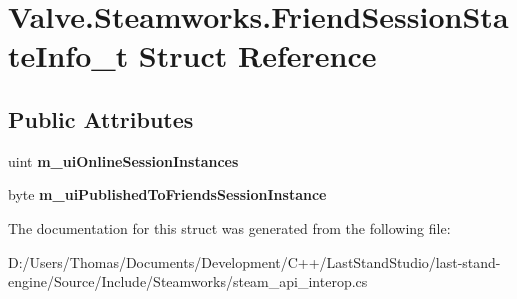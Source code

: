 \hypertarget{structValve_1_1Steamworks_1_1FriendSessionStateInfo__t}{}\section{Valve.\+Steamworks.\+Friend\+Session\+State\+Info\+\_\+t Struct Reference}
\label{structValve_1_1Steamworks_1_1FriendSessionStateInfo__t}
\subsection*{Public Attributes}
\begin{DoxyCompactItemize}
\item 
\hypertarget{structValve_1_1Steamworks_1_1FriendSessionStateInfo__t_a553ea9dabd98cb59e02837e0fda3c3c8}{}uint {\bfseries m\+\_\+ui\+Online\+Session\+Instances}\label{structValve_1_1Steamworks_1_1FriendSessionStateInfo__t_a553ea9dabd98cb59e02837e0fda3c3c8}

\item 
\hypertarget{structValve_1_1Steamworks_1_1FriendSessionStateInfo__t_ad781438dfe6156adac189dd569e88226}{}byte {\bfseries m\+\_\+ui\+Published\+To\+Friends\+Session\+Instance}\label{structValve_1_1Steamworks_1_1FriendSessionStateInfo__t_ad781438dfe6156adac189dd569e88226}

\end{DoxyCompactItemize}


The documentation for this struct was generated from the following file\+:\begin{DoxyCompactItemize}
\item 
D\+:/\+Users/\+Thomas/\+Documents/\+Development/\+C++/\+Last\+Stand\+Studio/last-\/stand-\/engine/\+Source/\+Include/\+Steamworks/steam\+\_\+api\+\_\+interop.\+cs\end{DoxyCompactItemize}
